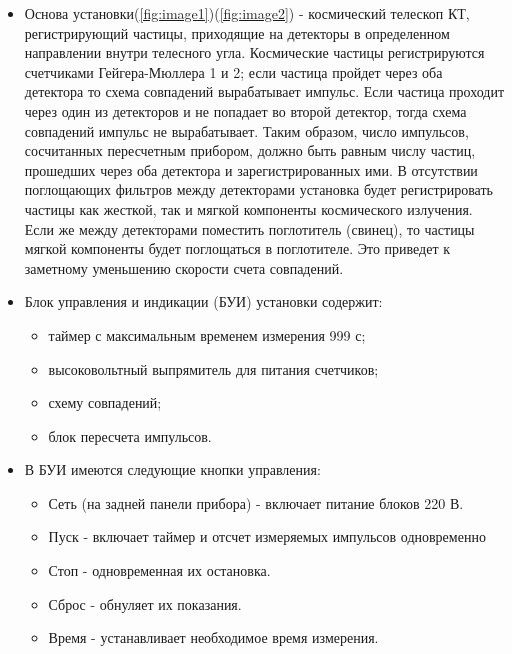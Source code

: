 \documentclass[a4paper,12pt]{article} %
\begin{document}
\begin{itemize}
    \item 

Основа установки(\ref{fig:image1})(\ref{fig:image2}) - космический телескоп КТ, регистрирующий частицы, приходящие на детекторы в определенном направлении внутри телесного угла.
 Космические частицы регистрируются счетчиками Гейгера-Мюллера 1
и 2; если частица пройдет через оба детектора
то схема совпадений вырабатывает импульс. Если частица
проходит через один из детекторов и не попадает во второй
детектор, тогда схема совпадений импульс не
вырабатывает. Таким образом, число импульсов, сосчитанных пересчетным прибором, должно быть равным числу частиц, прошедших через оба детектора и зарегистрированных ими.
В отсутствии поглощающих фильтров между детекторами установка будет регистрировать частицы как жесткой, так и мягкой компоненты космического излучения.
Если же между детекторами поместить поглотитель (свинец), то частицы мягкой компоненты будет поглощаться в поглотителе. Это приведет к заметному уменьшению скорости счета совпадений.\\
\item
Блок управления и индикации (БУИ) установки содержит:
\begin{itemize}
    \item таймер с максимальным временем измерения 999 с;
    \item высоковольтный выпрямитель для питания счетчиков;
    \item схему совпадений;
    \item блок пересчета импульсов.
\end{itemize}
\item
В БУИ имеются следующие кнопки управления:
\begin{itemize}
    \item Сеть (на задней панели прибора) - включает питание блоков 220 В.
    \item Пуск - включает таймер и отсчет измеряемых импульсов одновременно
    \item Стоп - одновременная их остановка.
    \item Сброс - обнуляет их показания.
    \item Время - устанавливает необходимое время измерения.
\end{itemize}

\end{itemize}
\newpage
\end{document}
